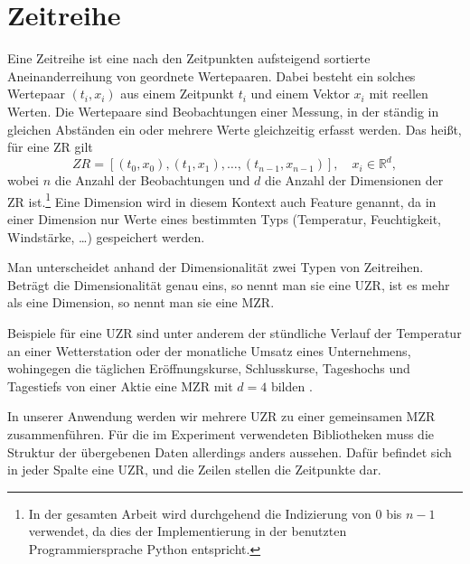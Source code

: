 \section{Zeitreihe}
Eine Zeitreihe ist eine nach den Zeitpunkten aufsteigend sortierte Aneinanderreihung von geordnete Wertepaaren. Dabei besteht ein solches Wertepaar $(t_i, x_i)$ aus einem Zeitpunkt $t_i$ und einem Vektor $x_i$ mit reellen Werten. Die Wertepaare sind Beobachtungen einer Messung, in der ständig in gleichen Abständen ein oder mehrere Werte gleichzeitig erfasst werden. Das heißt, für eine \ac{ZR} gilt 
\[ZR=[(t_0,x_0),(t_1,x_1),\ldots,(t_{n-1},x_{n-1})], \quad x_i \in \mathbb{R}^d,\]
wobei $n$ die Anzahl der Beobachtungen und $d$ die Anzahl der Dimensionen der \acs{ZR} ist.\footnote{In der gesamten Arbeit wird durchgehend die Indizierung von 0 bis $n-1$ verwendet, da dies der Implementierung in der benutzten Programmiersprache Python entspricht.}\label{foot:indexe} Eine Dimension wird in diesem Kontext auch Feature genannt, da in einer Dimension nur Werte eines bestimmten Typs (Temperatur, Feuchtigkeit, Windstärke, \dots) gespeichert werden.

Man unterscheidet anhand der Dimensionalität zwei Typen von Zeitreihen. Beträgt die Dimensionalität genau eins, so nennt man sie eine \ac{UZR}, ist es mehr als eine Dimension, so nennt man sie eine \ac{MZR}.

Beispiele für eine \acs{UZR} sind unter anderem der stündliche Verlauf der Temperatur an einer Wetterstation oder der monatliche Umsatz eines Unternehmens, wohingegen die täglichen Eröffnungskurse, Schlusskurse, Tageshochs und Tagestiefs von einer Aktie eine \acs{MZR} mit $d=4$ bilden \cite[Ch. 3.1]{compressionSurvey}.

In unserer Anwendung werden wir mehrere \acs{UZR} zu einer gemeinsamen \acs{MZR} zusammenführen. Für die im Experiment verwendeten Bibliotheken muss die Struktur der übergebenen Daten allerdings anders aussehen. Dafür befindet sich in jeder Spalte eine \acs{UZR}, und die Zeilen stellen die Zeitpunkte dar.